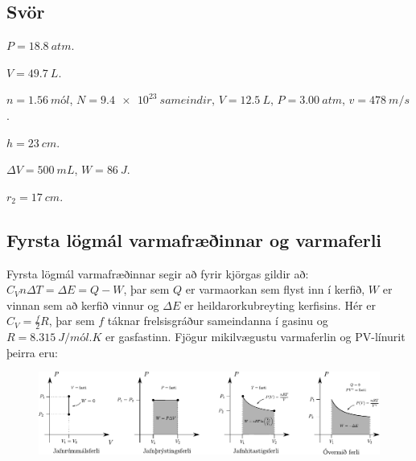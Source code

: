 \ifdefined \wholebook \else\documentclass[oneside]{book}\usepackage{EdlBook}\graphicspath{{figures/}}
\begin{document}
\begin{enumerate}[label = \textbf{Dæmi \thechapter.\arabic*.}]

\end{enumerate}

\subsection*{Svör}

\begin{enumerate*}[label = \vspace{0.15cm} \textbf{(\arabic*)}]
\setcounter{enumi}{7}
  \item $P = \SI{18.8}{atm}$.
  \item $V = \SI{49.7}{L}$.
  \item $n = \SI{1.56}{mól}$, $N = \SI{9.4e23}{sameindir}$, $V = \SI{12,5}{L}$, $P = \SI{3.00}{atm}$, $v = \SI{478}{m/s}$.
  \item $h = \SI{23}{cm}$.
  \item $\Delta V = \SI{500}{mL}$, $W = \SI{86}{J}$.
  \item $r_2 = \SI{17}{cm}$.
\end{enumerate*}

\newpage

\subsection*{Fyrsta lögmál varmafræðinnar og varmaferli}

\begin{tcolorbox}
Fyrsta lögmál varmafræðinnar segir að fyrir kjörgas gildir að: $C_V n \Delta T = \Delta E = Q - W$, þar sem $Q$ er varmaorkan sem flyst inn í kerfið, $W$ er vinnan sem að kerfið vinnur og $\Delta E$ er heildarorkubreyting kerfisins. Hér er $C_V = \frac{f}{2}R$, þar sem $f$ táknar frelsisgráður sameindanna í gasinu og $R = \SI{8.315}{J/mól.K}$ er gasfastinn. Fjögur mikilvægustu varmaferlin og PV-línurit þeirra eru:
\begin{figure}[H]
    \centering
    \includegraphics[width = \textwidth]{figures/varmaferlin.pdf}
\end{figure}
\end{tcolorbox}
\end{document}
